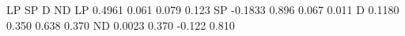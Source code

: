 \begin{Schunk}
\begin{Soutput}
        LP    SP      D    ND
LP  0.4961 0.061  0.079 0.123
SP -0.1833 0.896  0.067 0.011
D   0.1180 0.350  0.638 0.370
ND  0.0023 0.370 -0.122 0.810
\end{Soutput}
\end{Schunk}
